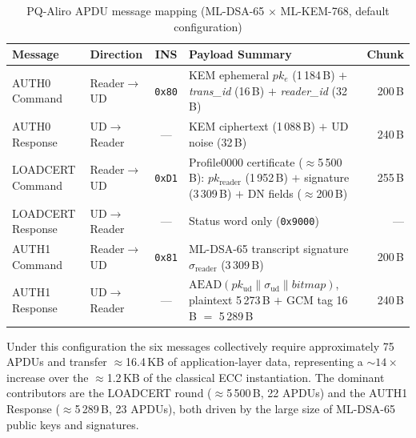 \begin{table}[t]
\caption{PQ-Aliro APDU message mapping (ML-DSA-65 $\times$ ML-KEM-768, default configuration)}
\label{tab:apdu}
\centering
\small
\begin{tabular}{llclr}
\hline
\textbf{Message} & \textbf{Direction} & \textbf{INS} & \textbf{Payload Summary} & \textbf{Chunk} \\
\hline
AUTH0 Command    & Reader$\to$UD & \texttt{0x80} &
    KEM ephemeral $pk_e$ (1\,184\,B) $+$ \textit{trans\_id} (16\,B) $+$ \textit{reader\_id} (32\,B) &
    200\,B \\
AUTH0 Response   & UD$\to$Reader & ---           &
    KEM ciphertext (1\,088\,B) $+$ UD noise (32\,B) &
    240\,B \\
LOADCERT Command & Reader$\to$UD & \texttt{0xD1} &
    Profile0000 certificate ($\approx$5\,500\,B): $pk_{\mathrm{reader}}$ (1\,952\,B) $+$ signature (3\,309\,B) $+$ DN fields ($\approx$200\,B) &
    255\,B \\
LOADCERT Response & UD$\to$Reader & ---          &
    Status word only (\texttt{0x9000}) &
    --- \\
AUTH1 Command    & Reader$\to$UD & \texttt{0x81} &
    ML-DSA-65 transcript signature $\sigma_{\mathrm{reader}}$ (3\,309\,B) &
    200\,B \\
AUTH1 Response   & UD$\to$Reader & ---           &
    $\mathrm{AEAD}(pk_{\mathrm{ud}} \mathbin{\|} \sigma_{\mathrm{ud}} \mathbin{\|} \mathit{bitmap})$,
    plaintext 5\,273\,B $+$ GCM tag 16\,B $=$ 5\,289\,B &
    240\,B \\
\hline
\end{tabular}
\end{table}

Under this configuration the six messages collectively require approximately
75 APDUs and transfer $\approx$16.4\,KB of application-layer data, representing
a $\sim\!14\times$ increase over the $\approx$1.2\,KB of the classical ECC
instantiation.  The dominant contributors are the LOADCERT round
($\approx$5\,500\,B, 22 APDUs) and the AUTH1 Response
($\approx$5\,289\,B, 23 APDUs), both driven by the large size of ML-DSA-65
public keys and signatures.
